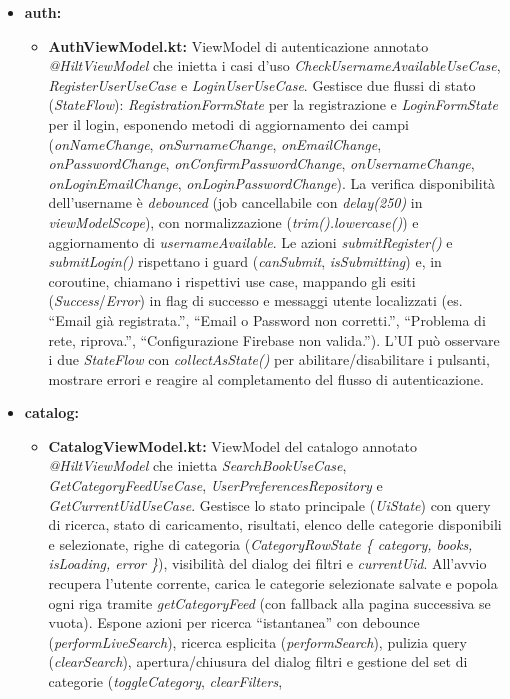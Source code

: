 \documentclass{article}
\begin{document}
\begin{itemize}
  \item \textbf{auth:}
  \begin{itemize}
    \item \textbf{AuthViewModel.kt:} ViewModel di autenticazione annotato \textit{@HiltViewModel} che inietta i casi d’uso \textit{CheckUsernameAvailableUseCase}, 
    \textit{RegisterUserUseCase} e \textit{LoginUserUseCase}. Gestisce due flussi di stato (\textit{StateFlow}): \textit{RegistrationFormState} per la registrazione e \textit{LoginFormState} per il login, esponendo metodi di aggiornamento 
    dei campi (\textit{onNameChange}, \textit{onSurnameChange}, \textit{onEmailChange}, \textit{onPasswordChange}, \textit{onConfirmPasswordChange}, \textit{onUsernameChange}, \textit{onLoginEmailChange}, \textit{onLoginPasswordChange}). 
    La verifica disponibilità dell’username è \emph{debounced} (job cancellabile con \textit{delay(250)} in \textit{viewModelScope}), con normalizzazione (\textit{trim().lowercase()}) e aggiornamento di \textit{usernameAvailable}. 
    Le azioni \textit{submitRegister()} e \textit{submitLogin()} rispettano i guard (\textit{canSubmit}, \textit{isSubmitting}) e, in coroutine, chiamano i rispettivi use case, mappando gli esiti (\textit{Success}/\textit{Error}) 
    in flag di successo e messaggi utente localizzati (es. “Email già registrata.”, “Email o Password non corretti.”, “Problema di rete, riprova.”, “Configurazione Firebase non valida.”). L’UI può osservare i due \textit{StateFlow} con \textit{collectAsState()} 
    per abilitare/disabilitare i pulsanti, mostrare errori e reagire al completamento del flusso di autenticazione.
  \end{itemize}
  \item \textbf{catalog:}
  \begin{itemize}
    \item \textbf{CatalogViewModel.kt:} ViewModel del catalogo annotato \textit{@HiltViewModel} che inietta \textit{SearchBookUseCase}, \textit{GetCategoryFeedUseCase}, \textit{UserPreferencesRepository} e \textit{GetCurrentUidUseCase}. Gestisce lo stato principale (\textit{UiState}) con query di ricerca, stato di caricamento, risultati, 
    elenco delle categorie disponibili e selezionate, righe di categoria (\textit{CategoryRowState \{ category, books, isLoading, error \}}), visibilità del dialog dei filtri e \textit{currentUid}. All’avvio recupera l’utente corrente, carica le categorie selezionate salvate e popola ogni riga tramite \textit{getCategoryFeed} 
    (con fallback alla pagina successiva se vuota). Espone azioni per ricerca “istantanea” con debounce (\textit{performLiveSearch}), ricerca esplicita (\textit{performSearch}), pulizia query (\textit{clearSearch}), apertura/chiusura del dialog filtri e gestione del set di categorie (\textit{toggleCategory}, \textit{clearFilters}, 

\end{itemize}
\end{itemize}
\end{document}
